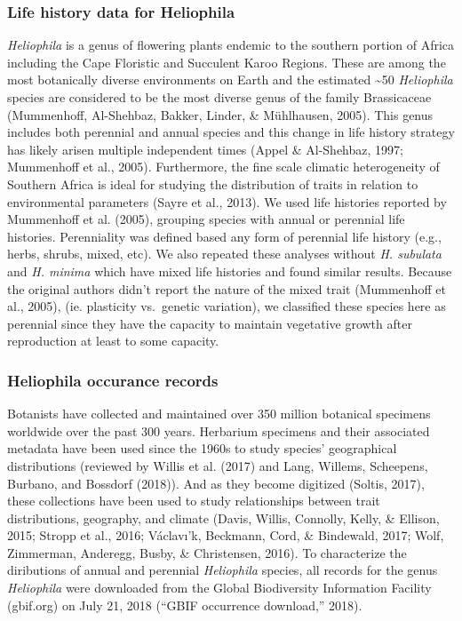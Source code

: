 \documentclass[man,floatsintext]{apa6}
\theoremstyle{definition}
\theoremstyle{definition}
\theoremstyle{definition}
\theoremstyle{remark}
\begin{document}
\hypertarget{life-history-data-for-heliophila}{%
\subsubsection{Life history data for
Heliophila}\label{life-history-data-for-heliophila}}

\emph{Heliophila} is a genus of flowering plants endemic to the southern
portion of Africa including the Cape Floristic and Succulent Karoo
Regions. These are among the most botanically diverse environments on
Earth and the estimated \textasciitilde{}50 \emph{Heliophila} species
are considered to be the most diverse genus of the family Brassicaceae
(Mummenhoff, Al-Shehbaz, Bakker, Linder, \& Mühlhausen, 2005). This
genus includes both perennial and annual species and this change in life
history strategy has likely arisen multiple independent times (Appel \&
Al-Shehbaz, 1997; Mummenhoff et al., 2005). Furthermore, the fine scale
climatic heterogeneity of Southern Africa is ideal for studying the
distribution of traits in relation to environmental parameters (Sayre et
al., 2013). We used life histories reported by Mummenhoff et al. (2005),
grouping species with annual or perennial life histories. Perenniality
was defined based any form of perennial life history (e.g., herbs,
shrubs, mixed, etc). We also repeated these analyses without \emph{H.
subulata} and \emph{H. minima} which have mixed life histories and found
similar results. Because the original authors didn't report the nature
of the mixed trait (Mummenhoff et al., 2005), (ie. plasticity
vs.~genetic variation), we classified these species here as perennial
since they have the capacity to maintain vegetative growth after
reproduction at least to some capacity.

\hypertarget{heliophila-occurance-records}{%
\subsubsection{Heliophila occurance
records}\label{heliophila-occurance-records}}

Botanists have collected and maintained over 350 million botanical
specimens worldwide over the past 300 years. Herbarium specimens and
their associated metadata have been used since the 1960s to study
species' geographical distributions (reviewed by Willis et al. (2017)
and Lang, Willems, Scheepens, Burbano, and Bossdorf (2018)). And as they
become digitized (Soltis, 2017), these collections have been used to
study relationships between trait distributions, geography, and climate
(Davis, Willis, Connolly, Kelly, \& Ellison, 2015; Stropp et al., 2016;
Václavı'k, Beckmann, Cord, \& Bindewald, 2017; Wolf, Zimmerman,
Anderegg, Busby, \& Christensen, 2016). To characterize the diributions
of annual and perennial \emph{Heliophila} species, all records for the
genus \emph{Heliophila} were downloaded from the Global Biodiversity
Information Facility (gbif.org) on July 21, 2018 (``GBIF occurrence
download,'' 2018).
\end{document}

